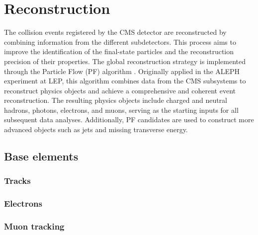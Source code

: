 \chapter{Reconstruction}

The collision events registered by the CMS detector are reconstructed by combining information from the different subdetectors.
This process aims to improve the identification of the final-state particles and the reconstruction precision of their properties.
The global reconstruction strategy is implemented through the Particle Flow (PF) algorithm \cite{ParticleFlow}.
Originally applied in the ALEPH experiment at LEP, this algorithm combines data from the CMS subsystems to reconstruct physics objects and achieve a comprehensive and coherent event reconstruction.
The resulting physics objects include charged and neutral hadrons, photons, electrons, and muons, serving as the starting inputs for all subsequent data analyses.
Additionally, PF candidates are used to construct more advanced objects such as jets and missing transverse energy.



\section{Base elements}
\subsection{Tracks}
\label{sec:tracks}


\subsection{Electrons}
\label{sec:eleReco}


\subsection{Muon tracking}
\label{sec:muonReco}


